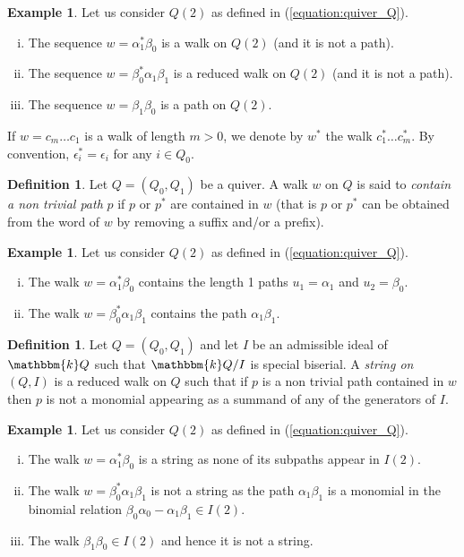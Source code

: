 \documentclass[11pt]{amsart}
\theoremstyle{definition}
\newtheorem{definition}[theorem]{Definition}
\newtheorem{example}[theorem]{Example}
\newcommand{\kk}{\mathbbm{k}}
\begin{document}
\begin{example}\label{exe:walk&path}
    Let us consider $Q(2)$ as defined in (\ref{equation:quiver_Q}).
    \begin{enumerate}[i)]
        \item The sequence $w=\alpha_1^*\beta_0$ is a  walk on $Q(2)$ (and it is not a path).
   \item    The sequence $w=\beta_0^*\alpha_1\beta_1$ is a reduced walk on $Q(2)$ (and it is not a path).
\item The sequence $w=\beta_1\beta_0$ is a path on $Q(2)$.
    \end{enumerate}
\end{example}


If $w=c_m\ldots c_1$ is a walk of length $m>0$, we denote by $w^*$ the walk $c_1^*\ldots c_m^*$. By convention, $\epsilon_i^*=\epsilon_i$ for any $i\in Q_0$. 
\begin{definition}Let $Q=(Q_0,Q_1)$ be a quiver.
 A walk $w$ on $Q$ is said to \emph{contain a non trivial path} $p$ if $p$ or $p^*$ are contained in $w$ (that is $p$ or $p^*$ can be obtained from the word of $w$ by removing a suffix and/or a prefix).
\end{definition}
\begin{example}Let us consider $Q(2)$ as defined in (\ref{equation:quiver_Q}).
    \begin{enumerate}[i)]
        \item The walk $w=\alpha_1^*\beta_0$ contains the length 1 paths $u_1=\alpha_1$ and $u_2=\beta_0$.
        \item The walk $w=\beta_0^*\alpha_1\beta_1$ contains the path $\alpha_1\beta_1$.
        \end{enumerate}
\end{example}

\begin{definition}
    Let $Q=(Q_0,Q_1)$ and let $I$ be an admissible ideal of $\kk Q$ such that $\kk Q/I$ is special biserial.
    A \emph{string on $(Q,I)$} is a reduced walk on $Q$ such that if $p$ is a non trivial path contained in $w$ then $p$ is not a monomial appearing as a summand of any of the generators of $I$.
\end{definition}

\begin{example}Let us consider $Q(2)$ as defined in (\ref{equation:quiver_Q}).
    \begin{enumerate}[i)]
        \item The walk $w=\alpha_1^*\beta_0$ is a string as none of its subpaths appear in $I(2)$.
        \item The walk $w=\beta_0^*\alpha_1\beta_1$ is not a string as the path $\alpha_1\beta_1$ is a monomial in the binomial relation $\beta_0\alpha_0-\alpha_1\beta_1\in I(2)$.
        \item The walk $\beta_1\beta_0\in I(2)$ and hence it is not a string.
   \end{enumerate}
\end{example}
\end{document}
